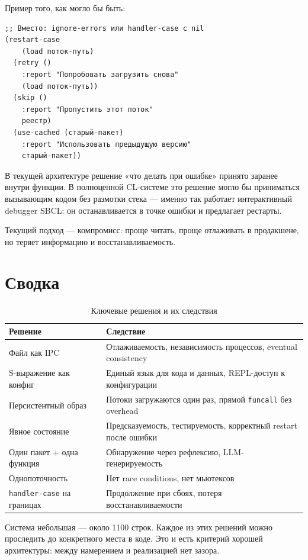 \documentclass[11pt,a4paper]{article}
\begin{document}
Пример того, как могло бы быть:

\begin{lstlisting}[caption={Гипотетический API с рестартами}]
;; Вместо: ignore-errors или handler-case с nil
(restart-case
    (load поток-путь)
  (retry ()
    :report "Попробовать загрузить снова"
    (load поток-путь))
  (skip ()
    :report "Пропустить этот поток"
    реестр)
  (use-cached (старый-пакет)
    :report "Использовать предыдущую версию"
    старый-пакет))
\end{lstlisting}

В текущей архитектуре решение «что делать при ошибке» принято заранее внутри функции. В полноценной CL-системе это решение могло бы приниматься вызывающим кодом без размотки стека — именно так работает интерактивный debugger SBCL: он останавливается в точке ошибки и предлагает рестарты.

Текущий подход — компромисс: проще читать, проще отлаживать в продакшене, но теряет информацию и восстанавливаемость.

\section{Сводка}

\begin{table}[H]\centering\small
\begin{tabular}{p{4cm}p{8cm}}
\toprule
\textbf{Решение} & \textbf{Следствие} \\
\midrule
Файл как IPC & Отлаживаемость, независимость процессов, eventual consistency \\
S-выражение как конфиг & Единый язык для кода и данных, REPL-доступ к конфигурации \\
Персистентный образ & Потоки загружаются один раз, прямой \texttt{funcall} без overhead \\
Явное состояние & Предсказуемость, тестируемость, корректный restart после ошибки \\
Один пакет + одна функция & Обнаружение через рефлексию, LLM-генерируемость \\
Однопоточность & Нет race conditions, нет мьютексов \\
\texttt{handler-case} на границах & Продолжение при сбоях, потеря восстанавливаемости \\
\bottomrule
\end{tabular}
\caption{Ключевые решения и их следствия}
\end{table}

Система небольшая — около 1100 строк. Каждое из этих решений можно проследить до конкретного места в коде. Это и есть критерий хорошей архитектуры: между намерением и реализацией нет зазора.
\end{document}
